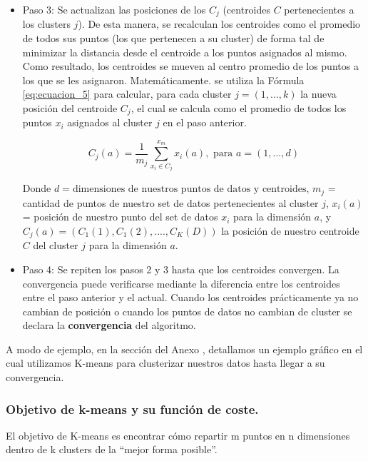 \documentclass[12pt,a4paper]{article}
\begin{document}
\begin{sloppypar}
\begin{itemize}
\item Paso 3: Se actualizan las posiciones de los $C_{j}$ (centroides $C$ pertenecientes a los clusters $j$). De esta manera, se recalculan los centroides como el promedio de todos sus puntos (los que pertenecen a su cluster) de forma tal de minimizar la distancia desde el centroide a los puntos asignados al mismo. Como resultado, los centroides se mueven al centro promedio de los puntos a los que se les asignaron. Matemáticamente. se utiliza la Fórmula \ref{eq:ecuacion_5} para calcular, para cada cluster $j=(1,...,k)$ la nueva posición del centroide $C_{j}$, el cual se calcula como el promedio de todos los puntos $x_{i}$ asignados al cluster $j$ en el paso anterior.  

\begin{equation}\label{eq:ecuacion_5}
C_{j}(a)=\frac{1}{m_{j}}\sum_{x_{i} \in C_{j}}^{x_{m}}x_{i}(a),     \text{   para  } a = (1,...,d)
\end{equation}

Donde $d = \text{dimensiones de nuestros puntos de datos y centroides}$, $m_{j}$ = cantidad de puntos de nuestro set de datos pertenecientes al cluster $j$, $x_{i}(a)$ = posición de nuestro punto del set de datos $x_{i}$ para la dimensión $a$, y $C_{j}(a)= (C_{1}(1),C_{1}(2),...., C_{K}(D))$ la posición de nuestro centroide $C$ del cluster $j$ para la dimensión $a$.

\item Paso 4: Se repiten los pasos 2 y 3 hasta que los centroides convergen. La convergencia puede verificarse mediante la diferencia entre los centroides entre el paso anterior y el actual. Cuando los centroides prácticamente ya no cambian de posición o cuando los puntos de datos no cambian de cluster se declara la \textbf{convergencia} del algoritmo.\\

\end{itemize}

A modo de ejemplo, en la sección del Anexo \textit{}, detallamos un ejemplo gráfico en el cual utilizamos K-means para clusterizar nuestros datos hasta llegar a su convergencia. 

\cleardoublepage

\subsubsection{Objetivo de k-means y su función de coste.}

El objetivo de K-means es encontrar cómo repartir m puntos en n dimensiones dentro de k clusters de la “mejor forma posible”. 


\end{sloppypar}
\end{document}

